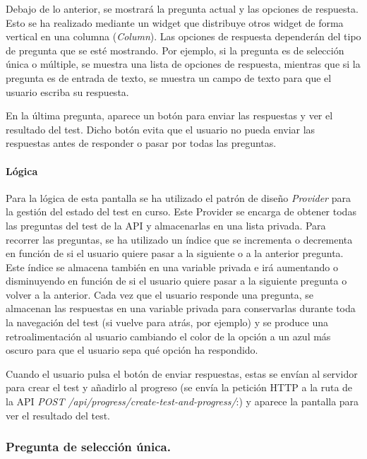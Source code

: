 Debajo de lo anterior, se mostrará la pregunta actual y las opciones de respuesta. Esto se ha realizado mediante un widget que distribuye otros widget de forma vertical en una columna (\textit{Column}). 
Las opciones de respuesta dependerán del tipo de pregunta que se esté mostrando. Por ejemplo, si la pregunta es de selección única o múltiple, se muestra una lista de opciones de respuesta, mientras que si la pregunta es de entrada de texto, se muestra un campo de texto para que el usuario escriba su respuesta.

En la última pregunta, aparece un botón para enviar las respuestas y ver el resultado del test. Dicho botón evita que el usuario no pueda enviar las respuestas antes de responder o pasar por todas las preguntas.

\paragraph*{Lógica}
Para la lógica de esta pantalla se ha utilizado el patrón de diseño \textit{Provider} para la gestión del estado del test en curso.
Este Provider se encarga de obtener todas las preguntas del test de la API y almacenarlas en una lista privada. Para recorrer las preguntas, se ha utilizado un índice que se incrementa o decrementa en función de si el usuario quiere pasar a la siguiente o a la anterior pregunta. Este índice se almacena también en una variable privada e irá aumentando o disminuyendo en función de si el usuario quiere pasar a la siguiente pregunta o volver a la anterior.
Cada vez que el usuario responde una pregunta, se almacenan las respuestas en una variable privada para conservarlas durante toda la navegación del test (si vuelve para atrás, por ejemplo) y se produce una retroalimentación al usuario cambiando el color de la opción a un azul más oscuro para que el usuario sepa qué opción ha respondido.

Cuando el usuario pulsa el botón de enviar respuestas, estas se envían al servidor para crear el test y añadirlo al progreso (se envía la petición HTTP a la ruta de la API \textit{POST /api/progress/create-test-and-progress/}:) y aparece la pantalla
para ver el resultado del test.


\newpage 

\subsubsection{Pregunta de selección única.}\mbox{}\\

